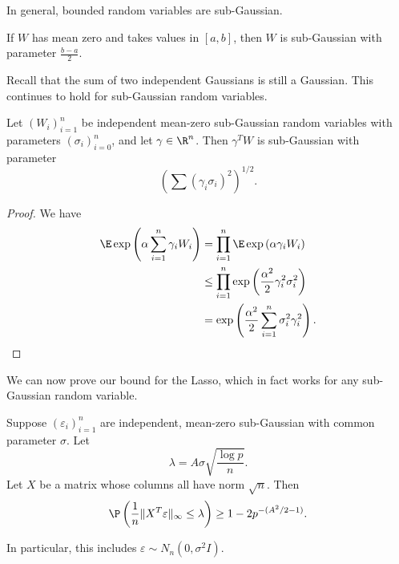 \documentclass[a4paper]{article}
\begin{document}
In general, bounded random variables are sub-Gaussian.
\begin{lemma}
  If $W$ has mean zero and takes values in $[a, b]$, then $W$ is sub-Gaussian with parameter $\frac{b - a}{2}$.\fakeqed
\end{lemma}

Recall that the sum of two independent Gaussians is still a Gaussian. This continues to hold for sub-Gaussian random variables.

\begin{prop}
  Let $(W_i)_{i = 1}^n$ be independent mean-zero sub-Gaussian random variables with parameters $(\sigma_i)_{i = 0}^n$, and let $\gamma \in \R^n$. Then $\gamma^T W$ is sub-Gaussian with parameter
  \[
    \left(\sum (\gamma_i \sigma_i)^2\right)^{1/2}.
  \]
\end{prop}

\begin{proof}
  We have
  \begin{align*}
    \E \exp \left(\alpha \sum_{i = 1}^n \gamma_i W_i\right) &= \prod_{i = 1}^n \E \exp \left(\alpha \gamma_i W_i\right)\\
    &\leq \prod_{i = 1}^n \exp\left(\frac{\alpha^2}{2} \gamma_i^2 \sigma_i^2\right)\\
    &= \exp\left(\frac{\alpha^2}{2} \sum_{i = 1}^n \sigma_i^2 \gamma_i^2\right).\qedhere
  \end{align*}
\end{proof}

We can now prove our bound for the Lasso, which in fact works for any sub-Gaussian random variable.
\begin{lemma}
  Suppose $(\varepsilon_i)_{i = 1}^n$ are independent, mean-zero sub-Gaussian with common parameter $\sigma$. Let
  \[
    \lambda = A \sigma \sqrt{\frac{\log p}{n}}.
  \]
  Let $X$ be a matrix whose columns all have norm $\sqrt{n}$. Then
  \[
    \P\left(\frac{1}{n} \|X^T \varepsilon\|_{\infty} \leq \lambda\right) \geq 1 - 2p^{-(A^2/2 - 1)}.
  \]
\end{lemma}
In particular, this includes $\varepsilon \sim N_n(0, \sigma^2I)$.
\end{document}
